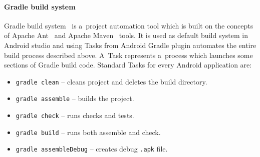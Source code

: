 \paragraph{Gradle build system}
Gradle build system~\cite{Gradle} is a~project automation tool which is built on the concepts of Apache Ant~\cite{Ant}
and Apache Maven~\cite{Maven} tools. It is used as default build system in Android studio and using Tasks from Android
Gradle plugin automates the entire build process described above. A~Task represents a~process which launches some
sections of Gradle build code. Standard Tasks for every Android application are:

\begin{itemize}
  \item \texttt{gradle clean} -- cleans project and deletes the build directory.
  \item \texttt{gradle assemble} -- builds the project.
  \item \texttt{gradle check} -- runs checks and tests.
  \item \texttt{gradle build} -- runs both assemble and check.
  \item \texttt{gradle assembleDebug} -- creates debug \texttt{.apk} file.
\end{itemize}
